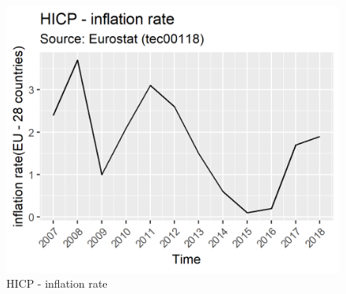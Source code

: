 \documentclass[l1pt, titlepage]{article}
\begin{document}
\begin{figure}
    \centering
    \includegraphics[width=.7\textwidth]{HICP.png}
    \caption{HICP - inflation rate}
    \label{figure 1}
\end{figure}
\end{document}
